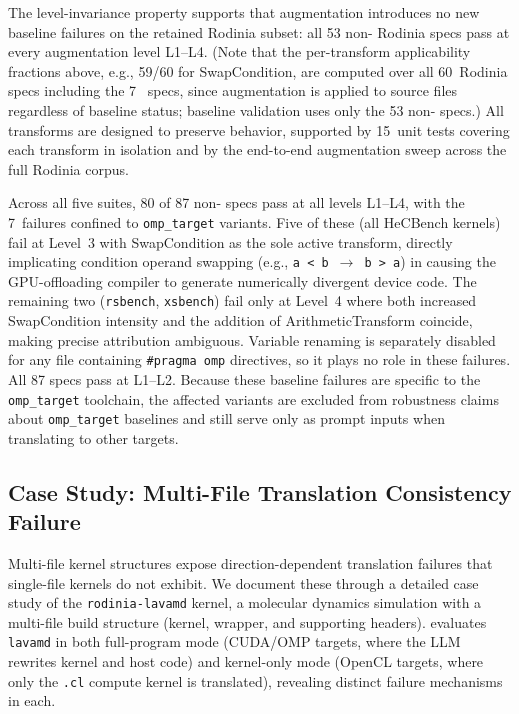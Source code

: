 The level-invariance property supports that augmentation introduces no new baseline failures on the retained Rodinia subset: all 53 non-\knownfail{} Rodinia specs pass at every augmentation level L1--L4. (Note that the per-transform applicability fractions above, e.g., 59/60 for SwapCondition, are computed over all 60~Rodinia specs including the 7~\knownfail{} specs, since augmentation is applied to source files regardless of baseline status; baseline validation uses only the 53 non-\knownfail{} specs.) All transforms are designed to preserve behavior, supported by 15~unit tests covering each transform in isolation and by the end-to-end augmentation sweep across the full Rodinia corpus.

Across all five suites, 80 of 87 non-\knownfail{} specs pass at all levels L1--L4, with the 7~failures confined to \texttt{omp\_target} variants. Five of these (all HeCBench kernels) fail at Level~3 with SwapCondition as the sole active transform, directly implicating condition operand swapping (e.g., \texttt{a~<~b}~$\to$~\texttt{b~>~a}) in causing the GPU-offloading compiler to generate numerically divergent device code. The remaining two (\texttt{rsbench}, \texttt{xsbench}) fail only at Level~4 where both increased SwapCondition intensity and the addition of ArithmeticTransform coincide, making precise attribution ambiguous. Variable renaming is separately disabled for any file containing \texttt{\#pragma~omp} directives, so it plays no role in these failures. All 87 specs pass at L1--L2. Because these baseline failures are specific to the \texttt{omp\_target} toolchain, the affected variants are excluded from robustness claims about \texttt{omp\_target} baselines and still serve only as prompt inputs when translating to other targets.


\subsection{Case Study: Multi-File Translation Consistency Failure}
\label{sec:appendix-e3}

Multi-file kernel structures expose direction-dependent translation failures that single-file kernels do not exhibit. We document these through a detailed case study of the \texttt{rodinia-lavamd} kernel, a molecular dynamics simulation with a multi-file build structure (kernel, wrapper, and supporting headers). \parbench{} evaluates \texttt{lavamd} in both full-program mode (CUDA/OMP targets, where the LLM rewrites kernel and host code) and kernel-only mode (OpenCL targets, where only the \texttt{.cl} compute kernel is translated), revealing distinct failure mechanisms in each.

